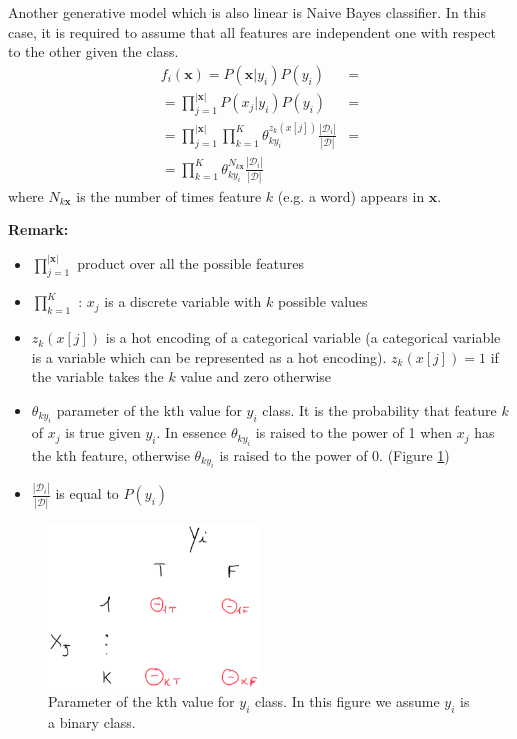 Another generative model which is also linear is Naive Bayes classifier. In this
case, it is required to assume that all features are independent one with respect
to the other given the class.
\begin{align*}
	f_{i}(\pmb{x}) = P(\pmb{x}| y_{i}) P(y_{i})                                                              & = \\
	= \prod_{j=1}^{|\pmb{x}|}P(x_{j}| y_{i}) P(y_{i})                                                        & = \\
	= \prod_{j=1}^{|\pmb{x}|}\prod_{k=1}^{K}\theta_{ky_i}^{z_k(x[j])}\frac{|\mathcal{D}_{i}|}{|\mathcal{D}|} & = \\
	= \prod_{k=1}^{K}\theta_{ky_i}^{N_{k\pmb{x}}}\frac{|\mathcal{D}_{i}|}{|\mathcal{D}|}
\end{align*}
where $N_{k\pmb{x}}$ is the number of times feature $k$ (e.g. a word) appears in
$\pmb{x}$.
\newline

\textbf{Remark:}
\begin{itemize}
	\item $\prod_{j=1}^{|\pmb{x}|}$ product over all the possible features

	\item $\prod_{k=1}^{K}$ : $x_{j}$ is a discrete variable with $k$ possible values

	\item $z_{k}(x[j])$ is a hot encoding of a categorical variable (a categorical
		variable is a variable which can be represented as a hot encoding).
		$z_{k}(x[j])=1$ if the variable takes the $k$ value and zero otherwise

	\item $\theta_{ky_i}$ parameter of the kth value for $y_{i}$ class. It is the
		probability that feature $k$ of $x_{j}$ is true given $y_{i}$. In essence $\theta
		_{ky_i}$ is raised to the power of 1 when $x_{j}$ has the kth feature,
		otherwise $\theta_{ky_i}$ is raised to the power of 0. (Figure \ref{fig:parameterOfTheKthValueForYiClass})

	\item $\frac{|\mathcal{D}_{i}|}{|\mathcal{D}|}$ is equal to $P(y_{i})$
\end{itemize}

\begin{figure}[H]
	\centering
	\includegraphics[width=0.5\textwidth]{
		images/12_LinearDiscriminantFunctions_naiveBayesClassifier.png
	}
	\caption{Parameter of the kth value for $y_{i}$ class. In this figure we assume
	$y_{i}$ is a binary class.}
	\label{fig:parameterOfTheKthValueForYiClass}
\end{figure}

